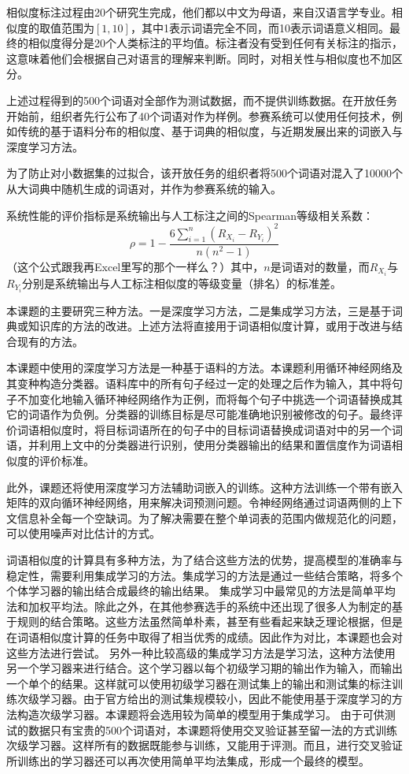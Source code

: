 相似度标注过程由20个研究生完成，他们都以中文为母语，来自汉语言学专业。相似度的取值范围为$[1, 10]$，其中1表示词语完全不同，而10表示词语意义相同。最终的相似度得分是20个人类标注的平均值。标注者没有受到任何有关标注的指示，这意味着他们会根据自己对语言的理解来判断。同时，对相关性与相似度也不加区分。

上述过程得到的500个词语对全部作为测试数据，而不提供训练数据。在开放任务开始前，组织者先行公布了40个词语对作为样例。参赛系统可以使用任何技术，例如传统的基于语料分布的相似度、基于词典的相似度，与近期发展出来的词嵌入与深度学习方法。

为了防止对小数据集的过拟合，该开放任务的组织者将500个词语对混入了10000个从大词典中随机生成的词语对，并作为参赛系统的输入。

系统性能的评价指标是系统输出与人工标注之间的Spearman等级相关系数：
\begin{equation}
\rho = 1 - \frac{6 \sum_{i = 1}^{n}(R_{X_i} - R_{Y_i})^2}{n(n^2 - 1)}
\end{equation}
（这个公式跟我再Excel里写的那个一样么？）其中，$n$是词语对的数量，而$R_{X_i}$与$R_{Y_i}$分别是系统输出与人工标注相似度的等级变量（排名）的标准差。

本课题的主要研究三种方法。一是深度学习方法，二是集成学习方法，三是基于词典或知识库的方法的改进。上述方法将直接用于词语相似度计算，或用于改进与结合现有的方法。

本课题中使用的深度学习方法是一种基于语料的方法。本课题利用循环神经网络及其变种构造分类器。语料库中的所有句子经过一定的处理之后作为输入，其中将句子不加变化地输入循环神经网络作为正例，而将每个句子中挑选一个词语替换成其它的词语作为负例。分类器的训练目标是尽可能准确地识别被修改的句子。最终评价词语相似度时，将目标词语所在的句子中的目标词语替换成词语对中的另一个词语，并利用上文中的分类器进行识别，使用分类器输出的结果和置信度作为词语相似度的评价标准。

此外，课题还将使用深度学习方法辅助词嵌入的训练。这种方法训练一个带有嵌入矩阵的双向循环神经网络，用来解决词预测问题。令神经网络通过词语两侧的上下文信息补全每一个空缺词。为了解决需要在整个单词表的范围内做规范化的问题，可以使用噪声对比估计的方式。

词语相似度的计算具有多种方法，为了结合这些方法的优势，提高模型的准确率与稳定性，需要利用集成学习的方法。集成学习的方法是通过一些结合策略，将多个个体学习器的输出结合成最终的输出结果。
集成学习中最常见的方法是简单平均法和加权平均法。除此之外，在其他参赛选手的系统中还出现了很多人为制定的基于规则的结合策略。这些方法虽然简单朴素，甚至有些看起来缺乏理论根据，但是在词语相似度计算的任务中取得了相当优秀的成绩。因此作为对比，本课题也会对这些方法进行尝试。
另外一种比较高级的集成学习方法是学习法，这种方法使用另一个学习器来进行结合。这个学习器以每个初级学习期的输出作为输入，而输出一个单个的结果。这样就可以使用初级学习器在测试集上的输出和测试集的标注训练次级学习器。由于官方给出的测试集规模较小，因此不能使用基于深度学习的方法构造次级学习器。本课题将会选用较为简单的模型用于集成学习。
由于可供测试的数据只有宝贵的500个词语对，本课题将使用交叉验证甚至留一法的方式训练次级学习器。这样所有的数据既能参与训练，又能用于评测。而且，进行交叉验证所训练出的学习器还可以再次使用简单平均法集成，形成一个最终的模型。


